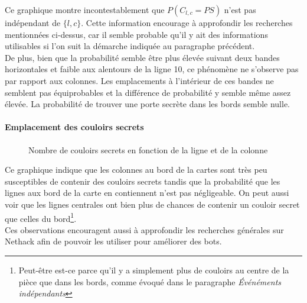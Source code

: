 \documentclass[a4paper,12pt]{article}
\begin{document}
Ce graphique montre incontestablement que $P(C_{l,c} = PS)$ n'est pas indépendant
de $\{l,c\}$. Cette information encourage à approfondir les recherches
mentionnées ci-dessus, car il semble probable qu'il y ait des informations
utilisables si l'on suit la démarche indiquée au paragraphe précédent.
\\
De plus, bien que la probabilité semble être plus élevée suivant deux bandes
horizontales et faible aux alentours de la ligne 10, ce phénomène ne s'observe
pas par rapport aux colonnes. Les emplacements à l'intérieur de ces bandes ne
semblent pas équiprobables et la différence de probabilité y semble même assez
élevée. La probabilité de trouver une porte secrète dans les bords semble nulle.

\paragraph{Emplacement des couloirs secrets}

\begin{figure}[H]
  \caption{\label{fig:3d_scorr_graph} Nombre de couloirs secrets en fonction
    de la ligne et de la colonne}
\end{figure}

Ce graphique indique que les colonnes au bord de la cartes sont très peu
susceptibles de contenir des couloirs secrets tandis que la probabilité que les
lignes aux bord de la carte en contiennent n'est pas négligeable. On peut aussi
voir que les lignes centrales ont bien plus de chances de contenir un couloir
secret que celles du bord\footnote{Peut-être est-ce parce qu'il y a simplement
plus de couloirs au centre de la pièce que dans les bords, comme évoqué dans le
paragraphe {\em Événéments indépendants}}.
\\
Ces observations encouragent aussi à approfondir les recherches générales sur
Nethack afin de pouvoir les utiliser pour améliorer des bots.
\end{document}
